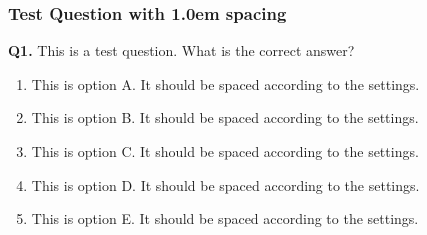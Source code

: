 \documentclass[
  letterpaper,
  DIV=11,
  numbers=noendperiod]{scrartcl}
\author{}
\date{}
\providecommand{\tightlist}{%
  \setlength{\itemsep}{0pt}\setlength{\parskip}{0pt}}
\def\tightlist{}
\begin{document}
\subsubsection{Test Question with 1.0em
spacing}\label{test-question-with-1.0em-spacing}

\textbf{Q1.} This is a test question. What is the correct answer?

\begin{enumerate}
\def\labelenumi{\alph{enumi}.}
\tightlist
\item
  This is option A. It should be spaced according to the settings.
\item
  This is option B. It should be spaced according to the settings.
\item
  This is option C. It should be spaced according to the settings.
\item
  This is option D. It should be spaced according to the settings.
\item
  This is option E. It should be spaced according to the settings.
\end{enumerate}
\end{document}
